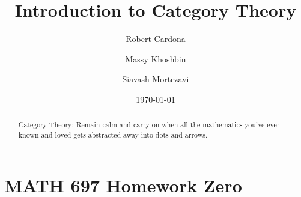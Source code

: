 \documentclass[8pt]{amsart}
\theoremstyle{plain}%
\theoremstyle{definition}
\theoremstyle{remark}
\numberwithin{equation}{section}
\begin{document}
\title[MATH 697]{Introduction to Category Theory}


\author{
	Robert Cardona %
	\and
	Massy Khoshbin %
	\and
	Siavash Mortezavi %
}


\address{Department of Mathematics \\ California State University Long Beach}

\date{\today}

\begin{abstract}
Category Theory: Remain calm and carry on when all the mathematics you've ever known and loved gets abstracted away into dots and arrows.
\end{abstract}

\maketitle

\setcounter{section}{-1}
\section{MATH 697 Homework Zero}
\end{document}
